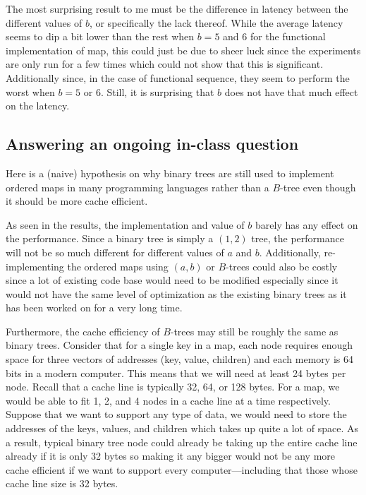 \documentclass{article}
\begin{document}
The most surprising result to me must be the difference in latency between the different values
of $b$, or specifically the lack thereof.
While the average latency seems to dip a bit lower than the rest when $b = 5$ and $6$ for
the functional implementation of map, this could just be due to sheer luck since the experiments
are only run for a few times which could not show that this is significant. Additionally since,
in the case of functional sequence, they seem to perform the worst when $b = 5$ or $6$.
Still, it is surprising that $b$ does not have that much effect on the latency.

\subsection*{Answering an ongoing in-class question}

Here is a (naive) hypothesis on why binary trees are still used to implement ordered
maps in many programming languages rather than a $B$-tree even though it should be more cache
efficient.

As seen in the results, the implementation and value of $b$ barely has any effect
on the performance. Since a binary tree is simply a $(1, 2)$ tree, the performance will not be
so much different for different values of $a$ and $b$. Additionally, re-implementing the ordered
maps using $(a, b)$ or $B$-trees could also be costly since a lot of existing code base would
need to be modified especially since it would not have the same level of optimization as the
existing binary trees as it has been worked on for a very long time.

Furthermore, the cache efficiency of $B$-trees may still be roughly the same as binary trees.
Consider that for a single key in a map, each node requires enough space for three
vectors of addresses (key, value, children) and each memory is 64 bits in a modern computer.
This means that we will need at least 24 bytes per node. 
Recall that a cache line is typically 32, 64, or 128 bytes. For a map, we would be able to fit
1, 2, and 4 nodes in a cache line at a time respectively. 
Suppose that we want to support any type of data, we would need to store the addresses of the keys,
values, and children which takes up quite a lot of space. As a result, typical binary tree node
could already be taking up the entire cache line already if it is only 32 bytes so making it any 
bigger would not be any more cache efficient if we want to support every computer---including
that those whose cache line size is 32 bytes.
\end{document}
